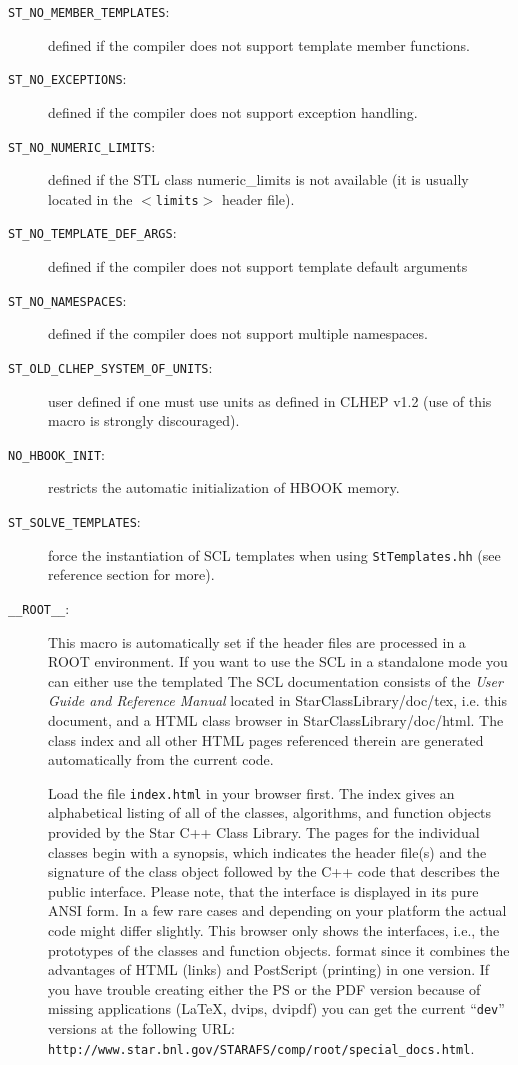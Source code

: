 \documentclass[twoside]{article}
\newcommand{\name}[1]{\textsf{#1}}%
\newcommand{\comp}[1]{\texttt{#1}}%
\begin{document}
\begin{description}
\item[\comp{ST\_NO\_MEMBER\_TEMPLATES}:] defined if the compiler does
    not support template member functions.
\item[\comp{ST\_NO\_EXCEPTIONS}:] defined if the compiler does not
    support exception handling. 
\item[\comp{ST\_NO\_NUMERIC\_LIMITS}:] defined if the STL class
    \name{numeric\_limits} is not available (it is usually located in
    the $<$\comp{limits}$>$ header file).
\item[\comp{ST\_NO\_TEMPLATE\_DEF\_ARGS}:] defined if the compiler
    does not support template default arguments
\item[\comp{ST\_NO\_NAMESPACES}:] defined if the compiler does not
    support multiple namespaces.
\item[\comp{ST\_OLD\_CLHEP\_SYSTEM\_OF\_UNITS}:] user defined if one
    must use units as defined in CLHEP v1.2 (use of this macro is
    strongly discouraged).
\item[\comp{NO\_HBOOK\_INIT}:] restricts the automatic initialization
    of HBOOK memory.
\item[\comp{ST\_SOLVE\_TEMPLATES}:] force the instantiation of SCL
    templates when using \texttt{StTemplates.hh} (see reference
    section for more).
\item[\comp{\_\_ROOT\_\_}:] This macro is automatically set if the
    header files are processed in a ROOT environment. If you want to
    use the SCL in a standalone mode you can either use the templated
The SCL documentation consists of the {\em User Guide and
    Reference Manual} located in \name{StarClassLibrary/doc/tex}, i.e.
this document, and a \name{HTML} class browser in
\name{StarClassLibrary/doc/html}.
The class index and all other \name{HTML} pages referenced therein are generated
automatically from the current code. 

Load the file \comp{index.html} in your browser first.
The index gives an alphabetical listing of all of the classes, algorithms,
and function objects provided by the Star C++ Class Library.
The pages for the individual classes begin with a synopsis, which indicates the
header file(s) and the signature of the class object followed by the \name{C++}
code that describes the public interface. Please note, that the interface is
displayed in its pure ANSI form. In a few rare cases and depending on your
platform the actual code might differ slightly. 
This browser only shows the interfaces, i.e., the prototypes of the classes and
function objects.
format since it combines the advantages of HTML (links) and PostScript
(printing) in one version. If you have trouble creating either the PS
or the PDF version because of missing applications (LaTeX, dvips,
dvipdf) you can get the current ``\texttt{dev}'' versions at the
following URL:
\texttt{http://www.star.bnl.gov/STARAFS/comp/root/special\_docs.html}.
                         

\end{description}
\end{document}
